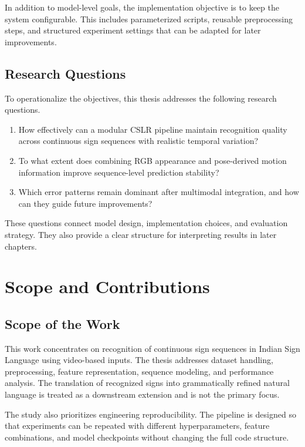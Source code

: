 In addition to model-level goals, the implementation objective is to keep the system configurable. This includes parameterized scripts, reusable preprocessing steps, and structured experiment settings that can be adapted for later improvements.

\subsection{Research Questions}

To operationalize the objectives, this thesis addresses the following research questions.

\begin{enumerate}
\item How effectively can a modular CSLR pipeline maintain recognition quality across continuous sign sequences with realistic temporal variation?
\item To what extent does combining RGB appearance and pose-derived motion information improve sequence-level prediction stability?
\item Which error patterns remain dominant after multimodal integration, and how can they guide future improvements?
\end{enumerate}

These questions connect model design, implementation choices, and evaluation strategy. They also provide a clear structure for interpreting results in later chapters.

\section{Scope and Contributions}

\subsection{Scope of the Work}

This work concentrates on recognition of continuous sign sequences in Indian Sign Language using video-based inputs. The thesis addresses dataset handling, preprocessing, feature representation, sequence modeling, and performance analysis. The translation of recognized signs into grammatically refined natural language is treated as a downstream extension and is not the primary focus.

The study also prioritizes engineering reproducibility. The pipeline is designed so that experiments can be repeated with different hyperparameters, feature combinations, and model checkpoints without changing the full code structure.

